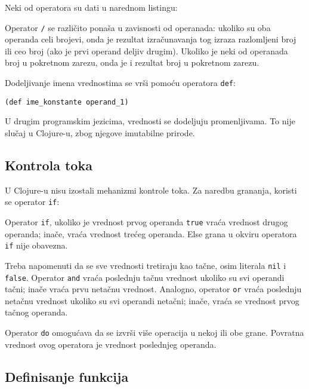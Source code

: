 Neki od operatora su dati u narednom listingu:



Operator \texttt{/} se različito ponaša u zavisnosti od operanada: ukoliko su oba operanda celi brojevi, onda je rezultat izračunavanja tog izraza razlomljeni broj ili ceo broj (ako je prvi operand deljiv drugim). Ukoliko je neki od operanada broj u pokretnom zarezu, onda je i rezultat broj u pokretnom zarezu.

Dodeljivanje imena vrednostima se vrši pomoću operatora \texttt{def}:

\begin{verbatim}
(def ime_konstante operand_1)
\end{verbatim}

U drugim programskim jezicima, vrednosti se dodeljuju promenljivama. To nije slučaj u Clojure-u, zbog njegove imutabilne prirode.

\subsection{Kontrola toka}
\label{subsec:kontrolatoka}

U Clojure-u nisu izostali mehanizmi kontrole toka. Za naredbu grananja, koristi se operator \texttt{if}:



Operator \texttt{if}, ukoliko je vrednost prvog operanda \texttt{true} vraća vrednost drugog operanda; inače, vraća vrednost trećeg operanda. Else grana u okviru operatora \texttt{if} nije obavezna.

Treba napomenuti da se sve vrednosti tretiraju kao tačne, osim literala \texttt{nil} i \texttt{false}. Operator \texttt{and} vraća poslednju tačnu vrednost ukoliko su svi operandi tačni; inače vraća prvu netačnu vrednost. Analogno, operator \texttt{or} vraća poslednju netačnu vrednost ukoliko su svi operandi netačni; inače, vraća se vrednost prvog tačnog operanda.

Operator \texttt{do} omogućava da se izvrši više operacija u nekoj ili obe grane. Povratna vrednost ovog operatora je vrednost poslednjeg operanda.

\subsection{Definisanje funkcija}
\label{subsec:definisanjefja}

